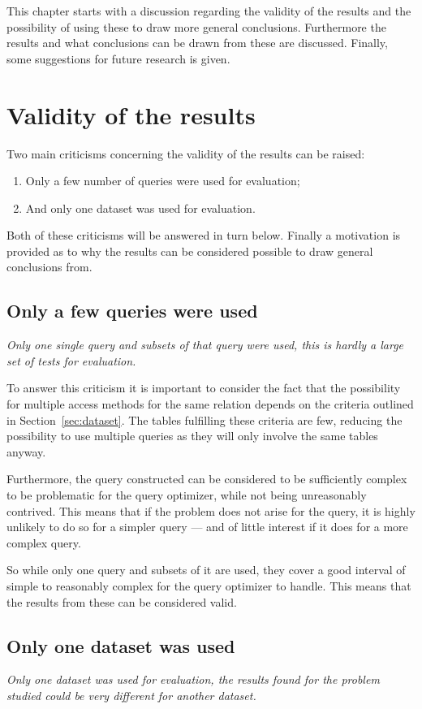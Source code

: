 This chapter starts with a discussion regarding the validity of the results and the
possibility of using these to draw more general conclusions. Furthermore the results
and what conclusions can be drawn from these are discussed. Finally, some
suggestions for future research is given.

\section{Validity of the results}\label{sec:validity}
Two main criticisms concerning the validity of the results can be raised:
\begin{enumerate}
\item Only a few number of queries were used for evaluation;
\item And only one dataset was used for evaluation.
\end{enumerate}

Both of these criticisms will be answered in turn below. Finally a motivation
is provided as to why the results can be considered possible to draw general
conclusions from.

\subsection{Only a few queries were used}
\textit{Only one single query and subsets of that query were used, this is hardly a
  large set of tests for evaluation.}

To answer this criticism it is important to consider the fact that the
possibility for multiple access methods for the same relation depends on the
criteria outlined in Section~\ref{sec:dataset}. The tables fulfilling these
criteria are few, reducing the possibility to use multiple queries as they will
only involve the same tables anyway.

Furthermore, the query constructed can be considered to be sufficiently complex
to be problematic for the query optimizer, while not being unreasonably
contrived. This means that if the problem does not arise for the query, it is
highly unlikely to do so for a simpler query --- and of little interest if it
does for a more complex query.

So while only one query and subsets of it are used, they cover a good interval
of simple to reasonably complex for the query optimizer to handle. This means that the
results from these can be considered valid.

\subsection{Only one dataset was used}
\textit{Only one dataset was used for evaluation, the results found for the
  problem studied could be very different for another dataset.}

